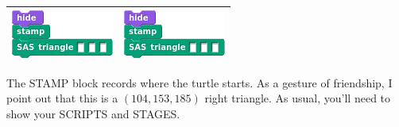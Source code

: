 \documentclass[noauthor,nooutcomes,12pt,hints]{ximera}
\begin{document}
\begin{question}
\begin{center}
\begin{tabular}{|c||c|}
      \includegraphics{SASstampBlank.png} & \includegraphics{SASstampBlank.png} \\\hline
    \end{tabular}
  \end{center}
  The STAMP block records where the turtle starts. As a gesture of
  friendship, I point out that this is a $(104, 153, 185)$ right
  triangle. As usual, you'll need to show your SCRIPTS and STAGES.
\end{question}
\mynewpage

\begin{question}%
\end{question}
\mynewpage

\begin{question}%
\end{question}
\mynewpage

\begin{question}%
\end{question}
\mynewpage
\end{document}
